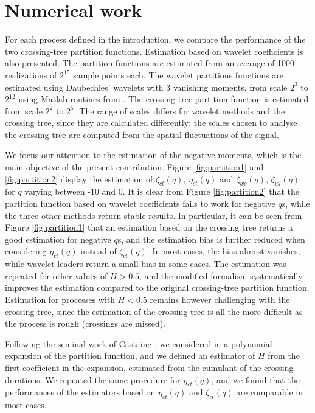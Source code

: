 \documentclass[a4paper]{article}
\begin{document}
\section{Numerical work}
\label{ssec:numwork}

For each process defined in the introduction, we compare the performance of the two crossing-tree partition functions. 
Estimation based on wavelet coefficients is also presented.
The partition functions are estimated from an average of 1000 realizations of $2^{15}$ sample points each. 
The wavelet partitions functions are estimated using Daubechies' wavelets with 3 vanishing moments, from scale $2^3$ to $2^{12}$ using Matlab routines from \cite{WendtSPM2007, WendtICASSP2008}.
The crossing tree partition function is estimated from scale $2^2$ to $2^5$.
The  range of scales differs for wavelet methods and the crossing tree, since they are calculated differently: the scales chosen to analyse the crossing tree are computed from the spatial fluctuations of the signal.
  
We focus our attention to the estimation of the negative moments, which is the main objective of the present contribution.
Figure \ref{fig:partition1} and \ref{fig:partition2} display the estimation of $\zeta_{ct}(q)$, $\eta_{ct}(q)$ and $\zeta_{wc}(q)$, $\zeta_{wl}(q)$ for $q$ varying between -10 and 0.
It is clear from Figure \ref{fig:partition2} that the partition function based on wavelet coefficients fails to work for negative $q$s, while the three other methods return stable results. 
In particular, it can be seen from Figure \ref{fig:partition1} that an estimation based on the crossing tree returns a good estimation for negative $q$s, and the estimation bias is further reduced when considering $\eta_{ct}(q)$ instead of $\zeta_{ct}(q)$.
In most cases, the bias almost vanishes, while wavelet leaders return a small bias in some cases.
The estimation was repeated for other values of $H> 0.5$, and the modified formalism systematically improves the estimation compared to the original crossing-tree partition function.
Estimation for processes with $H< 0.5$ remains however challenging with the crossing tree, since the estimation of the crossing tree is all the more difficult as the process is rough (crossings are missed).

Following the seminal work of Castaing \cite{Cast93}, we considered in \cite{DecrA15} a polynomial expansion of the partition function, and we defined an estimator of $H$ from the first coefficient in the expansion, estimated from the cumulant of the crossing durations. We repeated the same procedure for $\eta_{ct}(q)$, and we found that the performances of the estimators based on $\eta_{ct}(q)$ and $\zeta_{ct}(q)$ are comparable in most cases.
\end{document}
